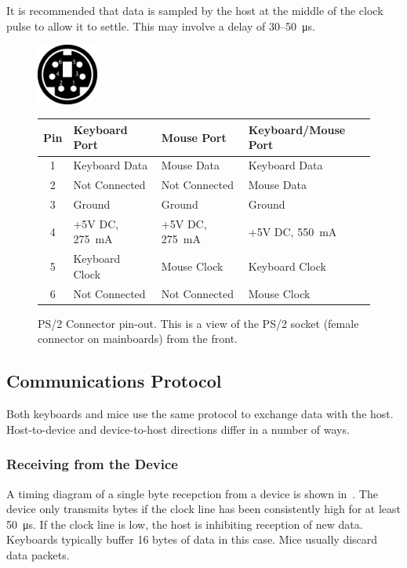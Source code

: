 It is recommended that data is sampled by the host at the middle of the clock
pulse to allow it to settle. This may involve a delay of 30–50~μs.

\begin{figure}
  \centering
  \includegraphics[width=2cm]{figs/MiniDIN-6_Socket_Pinout.pdf}
  \vspace{1em}\par

  \zebra
  \begin{tabular}{clll}
    Pin & Keyboard Port & Mouse Port & Keyboard/Mouse Port \\
    \hline
    1 & Keyboard Data & Mouse Data    & Keyboard Data \\
    2 & Not Connected & Not Connected & Mouse Data \\
    3 & Ground        & Ground        & Ground \\
    4 & +5V DC, 275~mA & +5V DC, 275~mA & +5V DC, 550~mA \\
    5 & Keyboard Clock & Mouse Clock    & Keyboard Clock \\
    6 & Not Connected & Not Connected & Mouse Clock \\
    \hline
  \end{tabular}
  \caption[PS/2 Connector Pin-Out]{\label{fig:kbd-ps2-pinout}PS/2 Connector
    pin-out. This is a view of the PS/2 socket (female connector on mainboards)
    from the front.}
\end{figure}

\subsection{Communications Protocol}

Both keyboards and mice use the same protocol to exchange data with the
host. Host-to-device and device-to-host directions differ in a number of ways.

\subsubsection{Receiving from the Device}

A timing diagram of a single byte recepction from a device is shown
in~. The device only transmits bytes if the clock line
has been consistently high for at least 50~μs. If the clock line is low, the
host is inhibiting reception of new data. Keyboards typically buffer 16 bytes
of data in this case. Mice usually discard data packets.

